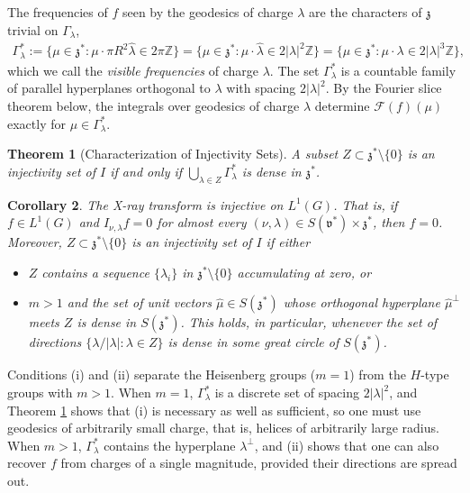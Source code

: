 \documentclass[11pt]{amsart}
\theoremstyle{plain}
\newtheorem{theorem}{Theorem}[section]
\newtheorem{corollary}[theorem]{Corollary}
\theoremstyle{definition}
\theoremstyle{remark}
\numberwithin{equation}{section}
\def\fz{\mathfrak{z}}
\def\fv{\mathfrak{v}}
\def\cF{\mathcal{F}}
\def\mz{\setminus\{0\}}
\def\Z{{\mathbb Z}}%
\numberwithin{equation}{section}
\begin{document}
The frequencies of $f$ seen by the geodesics of charge $\lambda$ are the characters of $\fz$ trivial on $\Gamma_\lambda$,
\begin{align*}
	\Gamma_\lambda^*:=\{\mu\in \fz^*: \mu\cdot\pi R^2\hat\lambda\in 2\pi\Z\}=\{\mu\in \fz^*: \mu\cdot\hat\lambda\in 2|\lambda|^2\Z\}=\{\mu\in \fz^*: \mu\cdot\lambda\in 2|\lambda|^3\Z\},
\end{align*}
which we call the \textit{visible frequencies} of charge $\lambda$. The set $\Gamma_\lambda^*$ is a countable family of parallel hyperplanes orthogonal to $\lambda$ with spacing $2|\lambda|^2$. By the Fourier slice theorem below, the integrals over geodesics of charge $\lambda$ determine $\cF(f)(\mu)$ exactly for $\mu\in \Gamma_\lambda^*$.

\begin{theorem}[Characterization of Injectivity Sets] \label{MainResult}
	A subset  $Z\subset \fz^*\mz$ is an injectivity set of $I$ if and only if $\bigcup_{\lambda\in Z}\Gamma_\lambda^*$ is dense in $\fz^*$.
\end{theorem}

\begin{corollary}\label{c:injSets}
	The X-ray transform is injective on $L^1(G)$. That is, if $f\in L^1(G)$ and $I_{\nu, \lambda}f=0$ for almost every $(\nu, \lambda)\in S(\fv^*)\times\fz^*$, then $f=0$. Moreover, $Z\subset \fz^*\mz$ is an injectivity set of $I$ if either
	\begin{itemize}
		\item[(i)] $Z$ contains a sequence $\{\lambda_i\}$ in $\fz^*\mz$ accumulating at zero, or
		\item[(ii)] $m>1$ and the set of unit vectors $\hat\mu\in S(\fz^*)$ whose orthogonal hyperplane $\hat\mu^\perp$ meets $Z$ is dense in $S(\fz^*)$. This holds, in particular, whenever the set of directions $\{\lambda/|\lambda|: \lambda\in Z\}$ is dense in some great circle of $S(\fz^*)$.
	\end{itemize}
\end{corollary}

Conditions (i) and (ii) separate the Heisenberg groups ($m=1$) from the $H$-type groups with $m>1$. When $m=1$, $\Gamma_\lambda^*$ is a discrete set of spacing $2|\lambda|^2$, and Theorem \ref{MainResult} shows that (i) is necessary as well as sufficient, so one must use geodesics of arbitrarily small charge, that is, helices of arbitrarily large radius. When $m>1$, $\Gamma_\lambda^*$ contains the hyperplane $\lambda^\perp$, and (ii) shows that one can also recover $f$ from charges of a single magnitude, provided their directions are spread out.
\end{document}
